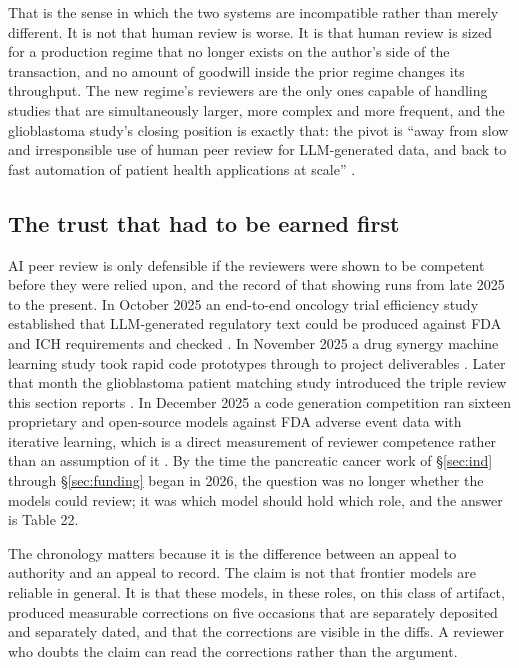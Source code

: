 That is the sense in which the two systems are incompatible rather than merely
different. It is not that human review is worse. It is that human review is
sized for a production regime that no longer exists on the author's side of the
transaction, and no amount of goodwill inside the prior regime changes its
throughput. The new regime's reviewers are the only ones capable of handling
studies that are simultaneously larger, more complex and more frequent, and the
glioblastoma study's closing position is exactly that: the pivot is ``away from
slow and irresponsible use of human peer review for LLM-generated data, and back
to fast automation of patient health applications at scale''
\cite{aiprgliomatc}.

\subsection{The trust that had to be earned first}

AI peer review is only defensible if the reviewers were shown to be competent
before they were relied upon, and the record of that showing runs from late 2025
to the present. In October 2025 an end-to-end oncology trial efficiency study
established that LLM-generated regulatory text could be produced against FDA and
ICH requirements and checked \cite{e2eefficiency2025}. In November 2025 a drug
synergy machine learning study took rapid code prototypes through to project
deliverables \cite{gbmsynergy2025}. Later that month the glioblastoma patient
matching study introduced the triple review this section reports
\cite{aiprgliomatc}. In December 2025 a code generation competition ran sixteen
proprietary and open-source models against FDA adverse event data with iterative
learning, which is a direct measurement of reviewer competence rather than an
assumption of it \cite{codegencomp2025}. By the time the pancreatic cancer work
of \S\ref{sec:ind} through \S\ref{sec:funding} began in 2026, the question was
no longer whether the models could review; it was which model should hold which
role, and the answer is Table 22.

The chronology matters because it is the difference between an appeal to
authority and an appeal to record. The claim is not that frontier models are
reliable in general. It is that these models, in these roles, on this class of
artifact, produced measurable corrections on five occasions that are separately
deposited and separately dated, and that the corrections are visible in the
diffs. A reviewer who doubts the claim can read the corrections rather than the
argument.

